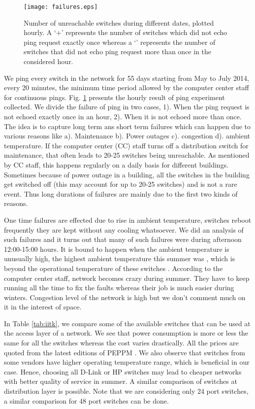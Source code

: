 \documentclass{article}
\begin{document}
\begin{figure}[t]
\centering
\texttt{[image: failures.eps]}
\caption{Number of unreachable switches during different dates, plotted hourly. A `+' represents the number of switches which did not echo ping request exactly once whereas a `' represents the number of switches that did not echo ping request more than once in the considered hour.}
\label{fig:unreachable}
\end{figure}

We ping every switch in the network for 55 days starting from  May to  July 2014, every 20 minutes, the minimum time period allowed by the computer center staff for continuous pings. Fig. \ref{fig:unreachable} presents the hourly result of ping experiment collected. We divide the failure of ping in two cases, 1). When the ping request is not echoed exactly once in an hour, 2). When it is not echoed more than once. The idea is to capture long term ans short term failures which can happen due to various reasons like a). Maintenance b). Power outages c). congestion d). ambient temperature. If the computer center (CC) staff turns off a distribution switch for maintenance, that often leads to 20-25 switches being unreachable. As mentioned by CC staff, this happens regularly on a daily basis for different buildings. Sometimes because of power outage in a building, all the switches in the building get switched off (this may account for up to 20-25 switches) and is not a rare event. Thus long durations of failures are mainly due to the first two kinds of reasons. 

One time failures are effected due to rise in ambient temperature, switches reboot frequently they are kept without any cooling whatsoever. We did an analysis of such failures and it turns out that many of such failures were during afternoon 12:00-15:00 hours. It is bound to happen when the ambient temperature is unusually high, the highest ambient temperature this summer was , which is beyond the operational temperature of these switches \cite{2960datasheet}. According to the computer center staff, network becomes crazy during summer. They have to keep running all the time to fix the faults whereas their job is much easier during winters. Congestion level of the network is high but we don't comment much on it in the interest of space. 

In Table \ref{tab:iitk}, we compare some of the available switches that can be used at the access layer of a network. We see that power consumption is more or less the same for all the switches whereas the cost varies drastically. All the prices are quoted from the latest editions of PEPPM \cite{peppm}. We also observe that switches from some vendors have higher operating temperature range, which is beneficial in our case. Hence, choosing all D-Link or HP switches may lead to cheaper networks with better quality of service in summer. A similar comparison of switches at distribution layer is possible. Note that we are considering only 24 port switches, a similar comparison for 48 port switches can be done. 
\end{document}
